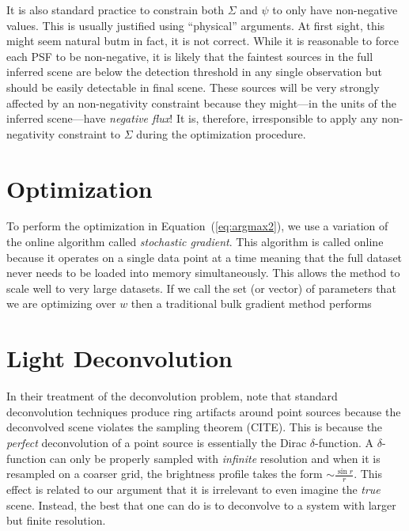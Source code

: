 \documentclass[12pt,preprint]{aastex}
\newcommand{\Eq}[1]{Equation~(\ref{eq:#1})}
\newcommand{\eq}[1]{\Eq{#1}}
\newcommand{\scene}{\ensuremath{\Sigma}}
\newcommand{\psf}{\ensuremath{\psi}}
\begin{document}
It is also standard practice to constrain both $\scene$ and $\psf$ to only
have non-negative values. This is usually justified using ``physical''
arguments. At first sight, this might seem natural butm in fact, it is not
correct. While it is reasonable to force each PSF to be non-negative, it
is likely that the faintest sources in the full inferred scene are
below the detection threshold in any single observation but should be
easily detectable in final scene. These sources will be very strongly
affected by an non-negativity constraint because they might---in the units
of the inferred scene---have \emph{negative flux}! It is, therefore,
irresponsible to apply any non-negativity constraint to $\scene$ during
the optimization procedure.

\section{Optimization}

To perform the optimization in \eq{argmax2}, we use a variation of the
online algorithm called \emph{stochastic gradient}. This algorithm is
called online because it operates on a single data point at a time
meaning that the full dataset never needs to be loaded into memory
simultaneously. This allows the method to scale well to very large
datasets. If we call the set (or vector) of parameters that we are
optimizing over $w$ then a traditional bulk gradient method performs


\section{Light Deconvolution}

In their treatment of the deconvolution problem, \citet{magain} note that
standard deconvolution techniques produce ring artifacts around point
sources because the deconvolved scene violates the sampling theorem (CITE).
This is because the \emph{perfect} deconvolution of a point source is
essentially the Dirac $\delta$-function. A $\delta$-function can only be
properly sampled with \emph{infinite} resolution and when it is resampled
on a coarser grid, the brightness profile takes the form
$\sim \frac{\sin r}{r}$. This effect is related to our argument that it
is irrelevant to even imagine the \emph{true} scene. Instead, the best
that one can do is to deconvolve to a system with larger but finite
resolution.
\end{document}
